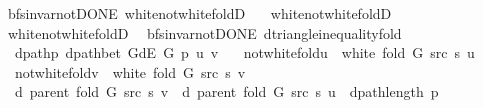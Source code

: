 \begin{isabellebody}
\endisatagproof
{\isafoldproof}%
%
\isadelimproof
\isanewline
%
\endisadelimproof
\isanewline
{}\isamarkupfalse%
\ {\isacharparenleft}{\kern0pt}\ bfs{\isacharunderscore}{\kern0pt}invar{\isacharunderscore}{\kern0pt}not{\isacharunderscore}{\kern0pt}DONE{\isacharparenright}{\kern0pt}\ white{\isacharunderscore}{\kern0pt}not{\isacharunderscore}{\kern0pt}white{\isacharunderscore}{\kern0pt}foldD\ {\isacharequal}{\kern0pt}\isanewline
\ \ white{\isacharunderscore}{\kern0pt}not{\isacharunderscore}{\kern0pt}white{\isacharunderscore}{\kern0pt}foldD\isanewline
\ \ white{\isacharunderscore}{\kern0pt}not{\isacharunderscore}{\kern0pt}white{\isacharunderscore}{\kern0pt}foldD{\isacharunderscore}{\kern0pt}{}\isanewline
\isanewline
{}\isamarkupfalse%
\ {\isacharparenleft}{\kern0pt}\ bfs{\isacharunderscore}{\kern0pt}invar{\isacharunderscore}{\kern0pt}not{\isacharunderscore}{\kern0pt}DONE{\isacharparenright}{\kern0pt}\ d{\isacharunderscore}{\kern0pt}triangle{\isacharunderscore}{\kern0pt}inequality{\isacharunderscore}{\kern0pt}fold{\isacharcolon}{\kern0pt}\isanewline
\ \ \ dpath{\isacharunderscore}{\kern0pt}p{\isacharcolon}{\kern0pt}\ {\isachardoublequoteopen}dpath{\isacharunderscore}{\kern0pt}bet\ {\isacharparenleft}{\kern0pt}G{\isachardot}{\kern0pt}dE\ G{\isacharparenright}{\kern0pt}\ p\ u\ v{\isachardoublequoteclose}\isanewline
\ \ \ not{\isacharunderscore}{\kern0pt}white{\isacharunderscore}{\kern0pt}fold{\isacharunderscore}{\kern0pt}u{\isacharcolon}{\kern0pt}\ {\isachardoublequoteopen}{\isasymnot}\ white\ {\isacharparenleft}{\kern0pt}fold\ G\ src\ s{\isacharparenright}{\kern0pt}\ u{\isachardoublequoteclose}\isanewline
\ \ \ not{\isacharunderscore}{\kern0pt}white{\isacharunderscore}{\kern0pt}fold{\isacharunderscore}{\kern0pt}v{\isacharcolon}{\kern0pt}\ {\isachardoublequoteopen}{\isasymnot}\ white\ {\isacharparenleft}{\kern0pt}fold\ G\ src\ s{\isacharparenright}{\kern0pt}\ v{\isachardoublequoteclose}\isanewline
\ \ \ {\isachardoublequoteopen}d\ {\isacharparenleft}{\kern0pt}parent\ {\isacharparenleft}{\kern0pt}fold\ G\ src\ s{\isacharparenright}{\kern0pt}{\isacharparenright}{\kern0pt}\ v\ {\isasymle}\ d\ {\isacharparenleft}{\kern0pt}parent\ {\isacharparenleft}{\kern0pt}fold\ G\ src\ s{\isacharparenright}{\kern0pt}{\isacharparenright}{\kern0pt}\ u\ {\isacharplus}{\kern0pt}\ dpath{\isacharunderscore}{\kern0pt}length\ p{\isachardoublequoteclose}\isanewline
%
\isadelimproof
%
\endisadelimproof
%
\isatagproof
{}\isamarkupfalse%

\end{isabellebody}
